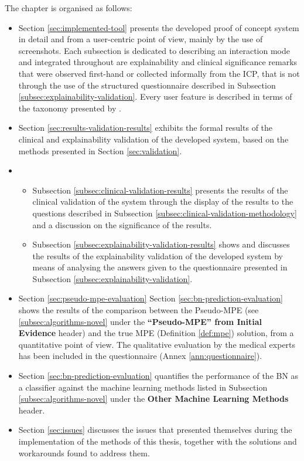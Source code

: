 The chapter is organised as follows:
\begin{itemize}
  \item Section \ref{sec:implemented-tool} presents the developed proof of concept system in detail and from a user-centric point of view, mainly by the use of screenshots.
	  Each subsection is dedicated to describing an interaction mode and integrated throughout are explainability and clinical significance remarks that were observed first-hand or collected informally from the ICP, that is not through the use of the structured questionnaire described in Subsection \ref{subsec:explainability-validation}.
	  Every user feature is described in terms of the taxonomy presented by \citep{lacave2002review}.
	\item Section \ref{sec:results-validation-results} exhibits the formal results of the clinical and explainability validation of the developed system, based on the methods presented in Section \ref{sec:validation}.
	\item \begin{itemize}
			  \item Subsection \ref{subsec:clinical-validation-results} presents the results of the clinical validation of the system through the display of the results to the questions described in Subsection \ref{subsec:clinical-validation-methodology} and a discussion on the significance of the results.
			  \item Subsection \ref{subsec:explainability-validation-results} shows and discusses the results of the explainability validation of the developed system by means of analysing the answers given to the questionnaire presented in Subsection \ref{subsec:explainability-validation}.
			\end{itemize}
	\item Section \ref{sec:pseudo-mpe-evaluation} Section \ref{sec:bn-prediction-evaluation} shows the results of the comparison between the Pseudo-MPE (see \ref{subsec:algorithms-novel} under the \textbf{\enquote{Pseudo-MPE} from Initial Evidence} header) and the true MPE (Definition \ref{def:mpe}) solution, from a quantitative point of view.
	The qualitative evaluation by the medical experts has been included in the questionnaire (Annex \ref{ann:questionnaire}).
	\item Section \ref{sec:bn-prediction-evaluation} quantifies the performance of the BN as a classifier against the machine learning methods listed in Subsection \ref{subsec:algorithms-novel} under the \textbf{Other Machine Learning Methods} header.
	\item Section \ref{sec:issues} discusses the issues that presented themselves during the implementation of the methods of this thesis, together with the solutions and workarounds found to address them.
\end{itemize}
